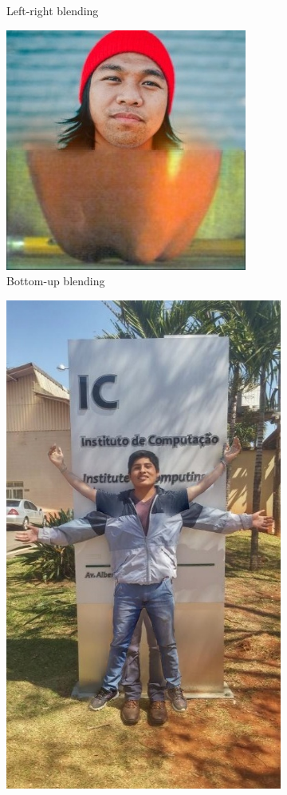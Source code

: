 \begin{figure}[h!]
\begin{subfigure}{0.33\textwidth}
  \caption{Left-right blending}
  \label{fig:blending-b}
\end{subfigure}%
\begin{subfigure}{0.33\textwidth}
  \centering
  \includegraphics[width=0.8\linewidth]{output/blending2.jpg}
  \caption{Bottom-up blending}
  \label{fig:blending-c}
\end{subfigure}
\begin{subfigure}{0.7\textwidth}
  \centering
  \includegraphics[width=0.8\linewidth]{output/blending.jpg}

\end{subfigure}
\end{figure}
